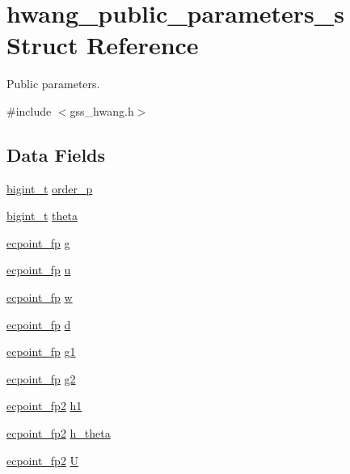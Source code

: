 \hypertarget{structhwang__public__parameters__s}{\section{hwang\-\_\-public\-\_\-parameters\-\_\-s Struct Reference}
\label{structhwang__public__parameters__s}
}


Public parameters.  




{\ttfamily \#include $<$gss\-\_\-hwang.\-h$>$}

\subsection*{Data Fields}
\begin{DoxyCompactItemize}
\item 
\hyperlink{types_8h_a7ae8816fa287bc4a98dec462acd2ad28}{bigint\-\_\-t} \hyperlink{structhwang__public__parameters__s_adc9f9aff37759616bf17c9fff35f93e1}{order\-\_\-p}
\item 
\hyperlink{types_8h_a7ae8816fa287bc4a98dec462acd2ad28}{bigint\-\_\-t} \hyperlink{structhwang__public__parameters__s_a14c0356c5e33b65ebe65312196b064f9}{theta}
\item 
\hyperlink{structecpoint__fp}{ecpoint\-\_\-fp} \hyperlink{structhwang__public__parameters__s_afe1b1377dbf0af80e02e3e4c0fe5549e}{g}
\item 
\hyperlink{structecpoint__fp}{ecpoint\-\_\-fp} \hyperlink{structhwang__public__parameters__s_a5e333ad9fada9cec12e44147d4a1b562}{u}
\item 
\hyperlink{structecpoint__fp}{ecpoint\-\_\-fp} \hyperlink{structhwang__public__parameters__s_ada4fca6c21c89063fefa888ba6768249}{w}
\item 
\hyperlink{structecpoint__fp}{ecpoint\-\_\-fp} \hyperlink{structhwang__public__parameters__s_a6c8fe1d87171daef20ce0aaae0f7ff25}{d}
\item 
\hyperlink{structecpoint__fp}{ecpoint\-\_\-fp} \hyperlink{structhwang__public__parameters__s_a6f2de41c1643791479b70080f64d6840}{g1}
\item 
\hyperlink{structecpoint__fp}{ecpoint\-\_\-fp} \hyperlink{structhwang__public__parameters__s_a7dd7dbff0fa94ecd607f0e89827ac4f6}{g2}
\item 
\hyperlink{structecpoint__fp2}{ecpoint\-\_\-fp2} \hyperlink{structhwang__public__parameters__s_a6612c7bab543c203426624532d2544e3}{h1}
\item 
\hyperlink{structecpoint__fp2}{ecpoint\-\_\-fp2} \hyperlink{structhwang__public__parameters__s_a989ee9630aa37f07a95f398250ac878c}{h\-\_\-theta}
\item 
\hyperlink{structecpoint__fp2}{ecpoint\-\_\-fp2} \hyperlink{structhwang__public__parameters__s_adfb0886d2b2b36a451e09055a4ba59ef}{U}
\end{DoxyCompactItemize}


